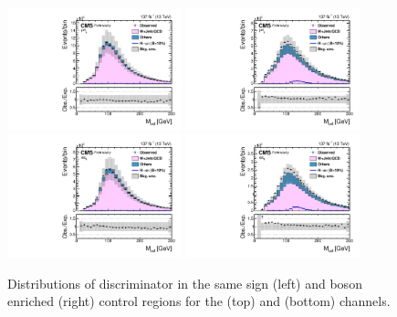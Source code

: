 \begin{figure}[htbp!]
  \centering
  \includegraphics[width=0.45\textwidth]{plots/chapter7/Fake/mutau/SS.pdf}
  \includegraphics[width=0.45\textwidth]{plots/chapter7/Fake/mutau/WOS.pdf}
  \includegraphics[width=0.45\textwidth]{plots/chapter7/Fake/etau/SS.pdf}
  \includegraphics[width=0.45\textwidth]{plots/chapter7/Fake/etau/WOS.pdf}
  \caption{Distributions of \mcol discriminator in the same sign (left) and \PW boson enriched (right) control regions for the \muhad (top) and \ehad (bottom) channels.}
  \label{fig:fake_control}
\end{figure}

